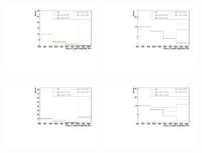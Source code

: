 \begin{figure}[h]
  \begin{center}
	\includegraphics[width=0.45\textwidth]{Plots/aQGC_kinematics/mass_lvj_type0_PuppiAK8_4bin_FM0.pdf}%
	\includegraphics[width=0.45\textwidth]{Plots/aQGC_kinematics/mass_lvj_type0_PuppiAK8_4bin_FM0_log.pdf}\\	
    \caption{}
  \end{center}
\end{figure}
\begin{figure}[h]
  \begin{center}
	\includegraphics[width=0.45\textwidth]{Plots/aQGC_kinematics/mass_lvj_type0_PuppiAK8_4bin_FM1.pdf}%
	\includegraphics[width=0.45\textwidth]{Plots/aQGC_kinematics/mass_lvj_type0_PuppiAK8_4bin_FM1_log.pdf}\\	
    \caption{}
  \end{center}
\end{figure}
